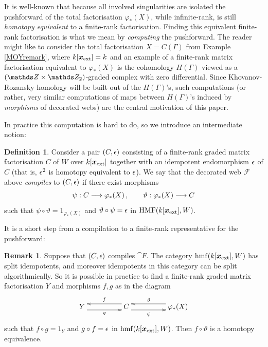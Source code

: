\documentclass{compositio}
\theoremstyle{definition}
\newtheorem{definition}[theorem]{Definition}
\newtheorem{remark}[theorem]{Remark}
\numberwithin{equation}{section}
\DeclareMathOperator{\hmf}{hmf}
\begin{document}
It is well-known that because all involved singularities are isolated the pushforward of the total factorisation $\varphi_*(X)$, while infinite-rank, is still \emph{homotopy equivalent} to a finite-rank factorisation. Finding this equivalent finite-rank factorisation is what we mean by \emph{computing} the pushforward. The reader might like to consider the total factorisation $X = C(\Gamma)$ from Example \ref{MOYremark}, where $k[\boldsymbol{x}_{\textup{ext}}] = k$ and an example of a finite-rank matrix factorisation equivalent to $\varphi_*(X)$ is the cohomology $H(\Gamma)$ viewed as a $(\ZZ \times \Ztwo)$-graded complex with zero differential. Since Khovanov-Rozansky homology will be built out of the $H(\Gamma)$'s, such computations (or rather, very similar computations of maps between $H(\Gamma)$'s induced by \emph{morphisms} of decorated webs) are the central motivation of this paper.

In practice this computation is hard to do, so we introduce an intermediate notion:

\begin{definition}
\label{def:compilation}
Consider a pair $(C, \epsilon)$ consisting of a finite-rank graded matrix factorisation $C$ of $W$ over $k[\boldsymbol{x}_{\textup{ext}}]$ together with an idempotent endomorphism $\epsilon$ of $C$ (that is, $\epsilon^2$ is homotopy equivalent to $\epsilon$). We say that the decorated web $\mathcal F$ above \emph{compiles} to $(C,\epsilon)$ if there exist morphisms
\[
\psi: C \longrightarrow \varphi_*(X) \, , \qquad \vartheta: \varphi_*(X) \longrightarrow C
\]
such that $\psi \circ \vartheta = 1_{\varphi_*(X)}$ and $\vartheta \circ \psi = \epsilon$ in $\operatorname{HMF}(k[\boldsymbol{x}_{\textup{ext}}],W)$.
\end{definition}

It is a short step from a compilation to a finite-rank representative for the pushforward:

\begin{remark} 
\label{compileAndSplit}
Suppose that $(C, \epsilon)$ compiles $\cat{F}$. The category $\hmf(k[\extvar],W)$ has split idempotents, and moreover idempotents in this category can be split algorithmically. So it is possible in practice to find a finite-rank graded matrix factorisation $Y$ and morphisms $f,g$ as in the diagram
\[
\xymatrix@C+2pc{
Y \ar@<-1ex>[r]_-{g} & C \ar@<-1ex>[l]_-{f}\ar@<-1ex>[r]_-{\psi} & \varphi_*(X) \ar@<-1ex>[l]_-{\vartheta}
}
\]
such that $f \circ g = 1_Y$ and $g \circ f = \epsilon$ in $\hmf(k[\extvar], W)$. Then $f \circ \vartheta$ is a homotopy equivalence. 
\end{remark}
\end{document}

